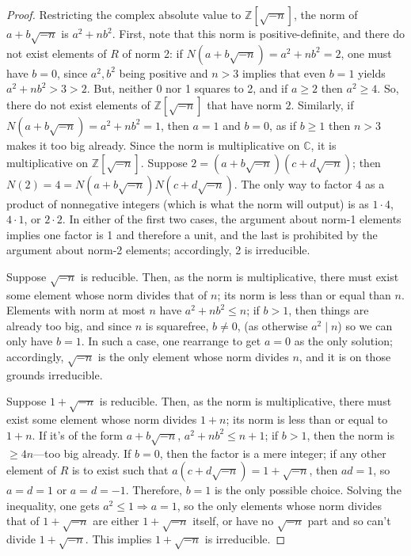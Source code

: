 \documentclass{article}
\begin{document}
\begin{proof}
  Restricting the complex absolute value to $\mathbb{Z}[\sqrt{-n}]$, the norm of $a + b\sqrt{-n}$ is $a^{2} + nb^{2}$.
  First, note that this norm is positive-definite, and there do not exist elements of $R$ of norm 2: if $N(a + b\sqrt{-n}) = a^{2} + nb^{2} = 2$,
  one must have $b = 0$, since $a^{2},b^{2}$ being positive and $n > 3$ implies that even $b = 1$
  yields $a^{2} + nb^{2} > 3 > 2$.
  But, neither 0 nor 1 squares to 2, and if $a \geq 2$ then $a^{2} \geq 4$.
  So, there do not exist elements of $\mathbb{Z}[\sqrt{-n}]$ that have norm $2$.
  Similarly, if $N(a + b \sqrt{-n}) = a^{2} + nb^{2} = 1$, then $a = 1$ and $b = 0$, as if $b \geq 1$ then $n > 3$ makes it too big already.
  Since the norm is multiplicative on $\mathbb{C}$, it is multiplicative on $\mathbb{Z}[\sqrt{-n}]$.
  Suppose $2 = (a + b\sqrt{-n})(c + d\sqrt{-n})$; then $N(2) = 4 = N(a + b\sqrt{-n})N(c + d\sqrt{-n})$.
  The only way to factor 4 as a product of nonnegative integers (which is what the norm will output) is as $1 \cdot 4$, $4 \cdot 1$, or $2\cdot 2$.
  In either of the first two cases, the argument about norm-1 elements implies one factor is 1 and therefore a unit,
  and the last is prohibited by the argument about norm-2 elements; accordingly, 2 is irreducible.

  Suppose $\sqrt{-n}$ is reducible.
  Then, as the norm is multiplicative, there must exist some element whose norm divides that of $n$; its norm is less than or equal than $n$.
  Elements with norm at most $n$ have $a^{2} + nb^{2} \leq n$; if $b > 1$, then things are already too big, and since $n$ is squarefree, $b \neq 0$,
  (as otherwise $a^{2} \mid n$) so we can only have $b = 1$.
  In such a case, one rearrange to get $a = 0$ as the only solution; accordingly, $\sqrt{-n}$ is the only element whose norm divides $n$,
  and it is on those grounds irreducible.

  Suppose $1 + \sqrt{-n}$ is reducible.
  Then, as the norm is multiplicative, there must exist some element whose norm divides $1 + n$; its norm is less than or equal to $1 + n$.
  If it's of the form $a + b\sqrt{-n}$, $a^{2} + nb^{2} \leq n + 1$; if $b > 1$, then the norm is $\geq 4n$---too big already.
  If $b = 0$, then the factor is a mere integer; if any other element of $R$ is to exist such that $a(c + d\sqrt{-n}) = 1 + \sqrt{-n}$,
  then $ad = 1$, so $a = d = 1$ or $a = d = -1$.
  Therefore, $b = 1$ is the only possible choice.
  Solving the inequality, one gets $a^{2} \leq 1 \Rightarrow a = 1$, so the only elements whose norm divides that of $1 + \sqrt{-n}$
  are either $1 + \sqrt{-n}$ itself, or have no $\sqrt{-n}$ part and so can't divide $1 + \sqrt{-n}$.
  This implies $1 + \sqrt{-n}$ is irreducible.


\end{proof}
\end{document}
